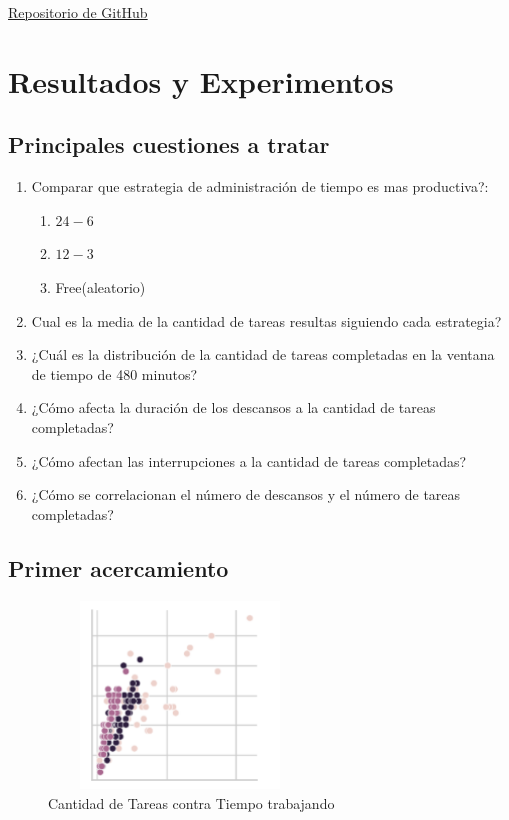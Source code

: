 \documentclass[10pt,a4paper,twocolumn]{article}
\begin{document}
\href{https://github.com/roo1202/Discrete-Event-Simulation-person-working}{Repositorio de GitHub}

\section{Resultados y Experimentos} 

\subsection{Principales cuestiones a tratar}
\begin{enumerate}
    \item Comparar que estrategia de administración de tiempo es mas productiva?:
    \begin{enumerate}
        \item $24-6$
        \item $12-3$
        \item Free(aleatorio)
    \end{enumerate}
    
    \item Cual es la media de la cantidad de tareas resultas siguiendo cada estrategia?
    \item ¿Cuál es la distribución de la cantidad de tareas completadas en la ventana de tiempo de 480 minutos?
    \item ¿Cómo afecta la duración de los descansos a la cantidad de tareas completadas?
    \item ¿Cómo afectan las interrupciones a la cantidad de tareas completadas?
    \item ¿Cómo se correlacionan el número de descansos y el número de tareas completadas? 
\end{enumerate}

\subsection{Primer acercamiento}

\begin{figure}[H] %
    \centering %
    \includegraphics[width=7cm, height=5cm]{Tareas_tiempotareas.png} %
    \caption{Cantidad de Tareas contra Tiempo trabajando } %
    \label{fig:mi_imagen4} %
\end{figure}
\end{document}
